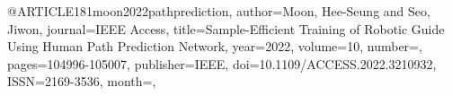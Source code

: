 @ARTICLE{181moon2022pathprediction,
author={Moon, Hee-Seung and Seo, Jiwon},
journal={IEEE Access}, 
title={Sample-Efficient Training of Robotic Guide Using Human Path Prediction Network}, 
year={2022},
volume={10},
number={},
pages={104996-105007},
publisher={IEEE},
doi={10.1109/ACCESS.2022.3210932},
ISSN={2169-3536},
month={},}